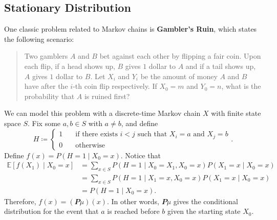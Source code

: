 \documentclass[math, code]{amznotes}
\theoremstyle{remark}
\begin{document}
\subsection{Stationary Distribution}
One classic problem related to Markov chains is \textbf{Gambler's Ruin}, which states the following scenario:
\begin{quote}
    Two gamblers $A$ and $B$ bet against each other by flipping a fair coin. Upon each flip, if a head shows up, $B$ gives $1$ dollar to $A$ and if a tail shows up, $A$ gives $1$ dollar to $B$. Let $X_i$ and $Y_i$ be the amount of money $A$ and $B$ have after the $i$-th coin flip respectively. If $X_0 = m$ and $Y_0 = n$, what is the probability that $A$ is ruined first? 
\end{quote}
We can model this problem with a discrete-time Markov chain $X$ with finite state space $S$. Fix some $a, b \in S$ with $a \neq b$, and define 
\begin{equation*}
    H \coloneqq \begin{cases}
        1 & \quad\textrm{if there exists } i < j \textrm{ such that } X_i = a \textrm{ and } X_j = b \\
        0 & \quad\textrm{otherwise}
    \end{cases}.
\end{equation*}
Define $f\left(x\right) = P\left(H = 1 \mid X_0 = x\right)$. Notice that 
\begin{align*}
    \mathbb{E}\left[f\left(X_1\right) \mid X_0 = x\right] & = \sum_{x \in S}P\left(H = 1 \mid X_0 = X_1, X_0 = x\right)P\left(X_1 = x \mid X_0 = x\right) \\
    & = \sum_{x \in S}P\left(H = 1 \mid X_1 = x, X_0 = x\right)P\left(X_1 = x \mid X_0 = x\right) \\
    & = P\left(H = 1 \mid X_0 = x\right).
\end{align*}
Therefore, $f\left(x\right) = \left(\mathbfit{P}\mu\right)\left(x\right)$. In other words, $\mathbfit{P}\mu$ gives the conditional distribution for the event that $a$ is reached before $b$ given the starting state $X_0$.
\end{document}
